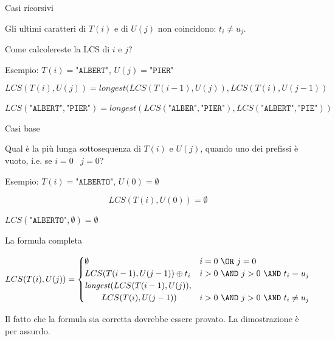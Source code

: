 \begin{frame}{Casi ricorsivi}

\vspace{-9pt}

Gli ultimi caratteri di $T(i)$ e di $U(j)$ non coincidono: \alert{$t_i \neq u_j$}. 

Come calcolereste la  LCS di $i$ e $j$?

\BIL
\item Esempio: $T(i)=\texttt{"ALBERT"}$, $U(j)=\texttt{"PIER"}$
\EIL

\pause
\bigskip
{}
\[
  LCS(T(i), U(j)) = \mathit{longest}( LCS(T(i-1), U(j)), LCS(T(i), U(j-1))
\]

\BIL
\item $LCS(\texttt{"ALBERT"},\texttt{"PIER"}) = \mathit{longest}(
  LCS(\texttt{"ALBER"},\texttt{"PIER"}),
  LCS(\texttt{"ALBERT"},\texttt{"PIE"}) )$
\EIL

\end{frame}

\begin{frame}{Casi base}
  

\vspace{-9pt}

Qual è la più lunga sottosequenza di $T(i)$ e $U(j)$, quando uno dei
prefissi è vuoto, i.e. se $i=0$ \OR\ $j=0$?
\BIL
\item Esempio: $T(i)=\texttt{"ALBERTO"}$, $U(0)=\emptyset$
\EIL

\pause
\bigskip
{}
\[
  LCS(T(i), U(0)) = \emptyset
\]

\BIL
\item $LCS(\texttt{"ALBERTO"}, \emptyset ) = \emptyset $
\EIL

\end{frame}

\begin{frame}{La formula completa}

\vspace{-9pt}
\begingroup
\footnotesize
\[
  LCS(T(i), U(j)) = \begin{cases}
  \emptyset & i=0\ \OR\ j=0 \\
  LCS(T(i-1), U(j-1)) \oplus t_i  & i>0\ \AND\ j>0\ \AND\ t_i = u_j \\
  \mathit{longest}( LCS(T(i-1),U(j)),  \\
  \qquad LCS(T(i), U(j-1)) & i>0\ \AND\ j>0\ \AND\ t_i \neq u_j 
  \end{cases}
\]
\endgroup

\bigskip
{}
Il fatto che la formula sia corretta dovrebbe essere provato. La dimostrazione
è per assurdo.
%

\end{frame}

